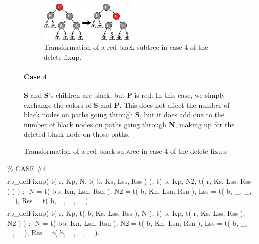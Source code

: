 \documentclass{article}
\newenvironment{code}{\obeycr\begin{it}\nopagebreak\addvspace{1ex}\noindent\footnotesize\begin{tabular}{|p{0.95\textwidth}|}\hline}{\\\hline\end{tabular}\par\addvspace{1ex}\end{it}\restorecr}
\begin{document}
\begin{figure}[h]
  \begin{figure}
    \includegraphics[width=0.5\textwidth]{Red-black_tree_delete_case_4}
    \caption{Transformation of a red-black subtree in case 4 of the delete fixup.}
    \label{delFix4}
  \end{figure}
  \paragraph{Case 4}
\textbf{S} and \textbf{S}'s children are black, but \textbf{P} is red. In this case, we simply exchange the colors of \textbf{S} and \textbf{P}. This does not affect the number of black nodes on paths going through \textbf{S}, but it does add one to the number of black nodes on paths going through \textbf{N}, making up for the deleted black node on those paths.
\end{figure}

\begin{code}
\% CASE \#4\\
rb\_delFixup( t( r, Kp, N, t( b, Ks, Lss, Rss ) ),
\hspace{13ex}t( b, Kp, N2, t( r, Ks, Lss, Rss ) ) ) :-
\hspace{2ex}N = t( bb, Kn, Lsn, Rsn ), 
\hspace{2ex}N2 = t( b, Kn, Lsn, Rsn ),
\hspace{2ex}Lss = t( b, \_, \_, \_ ),
\hspace{2ex}Rss = t( b, \_, \_, \_ ).\\
rb\_delFixup( t( r, Kp, t( b, Ks, Lss, Rss ), N ), 
\hspace{13ex}t( b, Kp, t( r, Ks, Lss, Rss ), N2 ) ) :-
\hspace{2ex}N = t( bb, Kn, Lsn, Rsn ), 
\hspace{2ex}N2 = t( b, Kn, Lsn, Rsn ),
\hspace{2ex}Lss = t( b, \_, \_, \_ ),
\hspace{2ex}Rss = t( b, \_, \_, \_ ).
\end{code}
\end{document}
